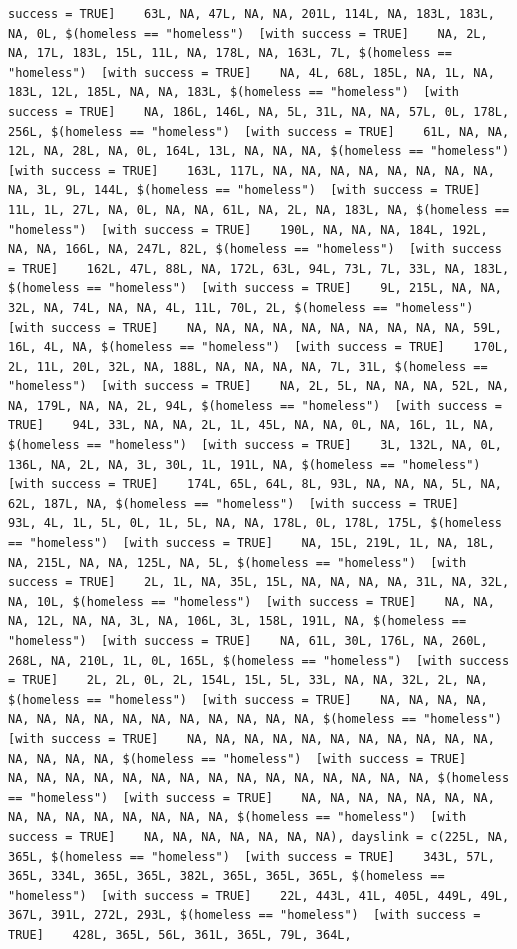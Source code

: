 \documentclass{tufte-book}\usepackage[]{graphicx}\usepackage[]{xcolor}
\makeatletter
\newenvironment{kframe}{%
 \def\at@end@of@kframe{}%
 \ifinner\ifhmode%
  \def\at@end@of@kframe{\end{minipage}}%
  \begin{minipage}{\columnwidth}%
 \fi\fi%
 \def\FrameCommand##1{\hskip\@totalleftmargin \hskip-\fboxsep
 \colorbox{shadecolor}{##1}\hskip-\fboxsep
     \hskip-\linewidth \hskip-\@totalleftmargin \hskip\columnwidth}%
 \MakeFramed {\advance\hsize-\width
   \@totalleftmargin\z@ \linewidth\hsize
   \@setminipage}}%
 {\par\unskip\endMakeFramed%
 \at@end@of@kframe}
\newenvironment{knitrout}{}{} %
\makeatother
\begin{document}
\begin{knitrout}
\begin{kframe}
\begin{verbatim}
success = TRUE]    63L, NA, 47L, NA, NA, 201L, 114L, NA, 183L, 183L, NA, 0L, $(homeless == "homeless")  [with success = TRUE]    NA, 2L, NA, 17L, 183L, 15L, 11L, NA, 178L, NA, 163L, 7L, $(homeless == "homeless")  [with success = TRUE]    NA, 4L, 68L, 185L, NA, 1L, NA, 183L, 12L, 185L, NA, NA, 183L, $(homeless == "homeless")  [with success = TRUE]    NA, 186L, 146L, NA, 5L, 31L, NA, NA, 57L, 0L, 178L, 256L, $(homeless == "homeless")  [with success = TRUE]    61L, NA, NA, 12L, NA, 28L, NA, 0L, 164L, 13L, NA, NA, NA, $(homeless == "homeless")  [with success = TRUE]    163L, 117L, NA, NA, NA, NA, NA, NA, NA, NA, NA, 3L, 9L, 144L, $(homeless == "homeless")  [with success = TRUE]    11L, 1L, 27L, NA, 0L, NA, NA, 61L, NA, 2L, NA, 183L, NA, $(homeless == "homeless")  [with success = TRUE]    190L, NA, NA, NA, 184L, 192L, NA, NA, 166L, NA, 247L, 82L, $(homeless == "homeless")  [with success = TRUE]    162L, 47L, 88L, NA, 172L, 63L, 94L, 73L, 7L, 33L, NA, 183L, $(homeless == "homeless")  [with success = TRUE]    9L, 215L, NA, NA, 32L, NA, 74L, NA, NA, 4L, 11L, 70L, 2L, $(homeless == "homeless")  [with success = TRUE]    NA, NA, NA, NA, NA, NA, NA, NA, NA, NA, 59L, 16L, 4L, NA, $(homeless == "homeless")  [with success = TRUE]    170L, 2L, 11L, 20L, 32L, NA, 188L, NA, NA, NA, NA, 7L, 31L, $(homeless == "homeless")  [with success = TRUE]    NA, 2L, 5L, NA, NA, NA, 52L, NA, NA, 179L, NA, NA, 2L, 94L, $(homeless == "homeless")  [with success = TRUE]    94L, 33L, NA, NA, 2L, 1L, 45L, NA, NA, 0L, NA, 16L, 1L, NA, $(homeless == "homeless")  [with success = TRUE]    3L, 132L, NA, 0L, 136L, NA, 2L, NA, 3L, 30L, 1L, 191L, NA, $(homeless == "homeless")  [with success = TRUE]    174L, 65L, 64L, 8L, 93L, NA, NA, NA, 5L, NA, 62L, 187L, NA, $(homeless == "homeless")  [with success = TRUE]    93L, 4L, 1L, 5L, 0L, 1L, 5L, NA, NA, 178L, 0L, 178L, 175L, $(homeless == "homeless")  [with success = TRUE]    NA, 15L, 219L, 1L, NA, 18L, NA, 215L, NA, NA, 125L, NA, 5L, $(homeless == "homeless")  [with success = TRUE]    2L, 1L, NA, 35L, 15L, NA, NA, NA, NA, 31L, NA, 32L, NA, 10L, $(homeless == "homeless")  [with success = TRUE]    NA, NA, NA, 12L, NA, NA, 3L, NA, 106L, 3L, 158L, 191L, NA, $(homeless == "homeless")  [with success = TRUE]    NA, 61L, 30L, 176L, NA, 260L, 268L, NA, 210L, 1L, 0L, 165L, $(homeless == "homeless")  [with success = TRUE]    2L, 2L, 0L, 2L, 154L, 15L, 5L, 33L, NA, NA, 32L, 2L, NA, $(homeless == "homeless")  [with success = TRUE]    NA, NA, NA, NA, NA, NA, NA, NA, NA, NA, NA, NA, NA, NA, NA, $(homeless == "homeless")  [with success = TRUE]    NA, NA, NA, NA, NA, NA, NA, NA, NA, NA, NA, NA, NA, NA, NA, $(homeless == "homeless")  [with success = TRUE]    NA, NA, NA, NA, NA, NA, NA, NA, NA, NA, NA, NA, NA, NA, NA, $(homeless == "homeless")  [with success = TRUE]    NA, NA, NA, NA, NA, NA, NA, NA, NA, NA, NA, NA, NA, NA, NA, $(homeless == "homeless")  [with success = TRUE]    NA, NA, NA, NA, NA, NA, NA), dayslink = c(225L, NA, 365L, $(homeless == "homeless")  [with success = TRUE]    343L, 57L, 365L, 334L, 365L, 365L, 382L, 365L, 365L, 365L, $(homeless == "homeless")  [with success = TRUE]    22L, 443L, 41L, 405L, 449L, 49L, 367L, 391L, 272L, 293L, $(homeless == "homeless")  [with success = TRUE]    428L, 365L, 56L, 361L, 365L, 79L, 364L, 
\end{verbatim}
\end{kframe}
\end{knitrout}
\end{document}
